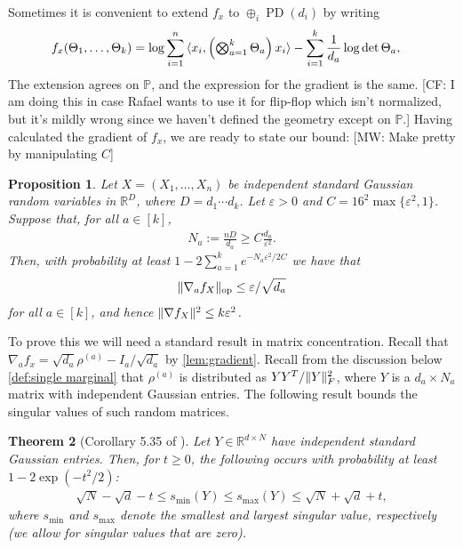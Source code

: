 \documentclass[aos]{imsart}
\newtheorem{theorem}{Theorem}[section]
\newtheorem{prop}[theorem]{Proposition}
\theoremstyle{definition}
\numberwithin{equation}{section}
\DeclareMathOperator{\op}{op}
\DeclareMathOperator{\PD}{PD}
\DeclarePairedDelimiter{\norm}{\lVert}{\rVert}
\newcommand{\R}{{\mathbb{R}}}
\renewcommand{\P}{{\mathbb{P}}}
\newcommand{\eps}{\varepsilon}
\newcommand{\samp}{x}
\newcommand{\rv}{X}
\newcommand{\CF}[1]{{\color{purple}[CF: #1]}}
\newcommand{\MW}[1]{{\color{red}[MW: #1]}}
\begin{document}
 Sometimes it is convenient to extend $f_{\samp}$ to $\oplus_i \PD(d_i)$ by writing
 \begin{align}
   f_{\samp}(\Theta_1,\dots,\Theta_k) &=   \log \sum_{i=1}^n \braket{\samp_i, \left( \textstyle \bigotimes_{a=1}^k \Theta_a \right) \samp_i} - \sum_{i=1}^k \frac1{d_a} \log \det \Theta_a,\label{eq:f extension}
 \end{align}
The extension agrees on $\P$, and the expression for the gradient is the same. \CF{I am doing this in case Rafael wants to use it for flip-flop which isn't normalized, but it's mildly wrong since we haven't defined the geometry except on $\P$.} 
Having calculated the gradient of $f_\samp$, we are ready to state our bound:
\MW{Make pretty by manipulating $C$}
\begin{prop}\label{prop:gradient-bound}
Let $\rv = (\rv_1,\dots,\rv_n)$ be independent standard Gaussian random variables in $\R^D$, where $D=d_1\cdots{}d_k$.
Let $\eps>0$ and $C = 16^2\max\{\eps^2,1\}$.
Suppose that, for all $a \in [k]$,
\begin{align*}
  N_a := \frac{n D}{d_a} \geq C \frac{d_a}{\eps^2}.
\end{align*}
Then, with probability at least $1 - 2 \sum_{a=1}^k e^{-N_a \eps^2/2C}$ we have that
\begin{align*}
  \norm{\nabla_a f_{\rv}}_{\op} \leq \eps/\sqrt{d_a}
\end{align*}
for all $a\in[k]$, and hence $\norm{\nabla f_{\rv}}^2 \leq k \eps^2$.
\end{prop}

To prove this we will need a standard result in matrix concentration.
Recall that $\nabla_a f_{\samp} = \sqrt{d_a} \rho^{(a)} - I_a/\sqrt{d_a}$ by \cref{lem:gradient}.
Recall from the discussion below \cref{def:single marginal} that $\rho^{(a)}$ is distributed as $Y Y^T / \norm{Y}_F^2$, where $Y$ is a $d_a \times N_a$ matrix with independent Gaussian entries.
The following result bounds the singular values of such random matrices.

\begin{theorem}[Corollary 5.35 of \cite{vershynin2010introduction}]\label{cor:vershynin}
Let $Y \in \R^{d \times N}$ have independent standard Gaussian entries.
Then, for $t \geq 0$, the following occurs with probability at least $1 - 2 \exp(-t^{2}/2)$:
\begin{align*}
  \sqrt{N} - \sqrt{d} - t \leq s_{\min}(Y) \leq s_{\max}(Y) \leq \sqrt{N} + \sqrt{d} + t,
\end{align*}
where $s_{\min}$ and $s_{\max}$ denote the smallest and largest singular value, respectively (we allow for singular values that are zero).
\end{theorem}
\end{document}
